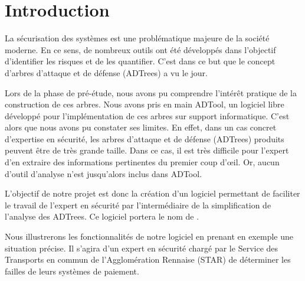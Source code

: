 \section{Introduction}
	La sécurisation des systèmes est une problématique majeure de la société moderne. En ce sens, de nombreux outils %
	ont été développés dans l'objectif d'identifier les risques et de les quantifier. C'est dans ce but que le concept d'arbres d'attaque et de défense (ADTrees) a vu le jour.
	
	Lors de la phase de pré-étude, nous avons pu comprendre l’intérêt pratique de la construction de ces arbres. %
	Nous avons pris en main ADTool, un logiciel libre développé pour l'implémentation de ces arbres sur support informatique. C'est alors que nous avons pu constater ses limites. En effet, dans un cas concret d'expertise en sécurité, %
	les arbres d'attaque et de défense (ADTrees) produits peuvent être de très grande taille. Dans ce cas, il est très difficile pour l'expert d'en extraire des informations pertinentes du premier coup d’œil. Or, aucun d'outil d'analyse n'est jusqu'alors inclus dans ADTool.

	L'objectif de notre projet est donc la création d'un logiciel permettant de faciliter le travail de l'expert en sécurité par l’intermédiaire de la simplification de l'analyse des ADTrees. %
	 Ce logiciel portera le nom de \glasir. %

	Nous illustrerons les fonctionnalités de notre logiciel en prenant en exemple une situation précise. Il s'agira d'un expert en sécurité chargé par le Service des Transports en commun de l'Agglomération Rennaise (STAR) de déterminer les failles de leurs systèmes de paiement. 













